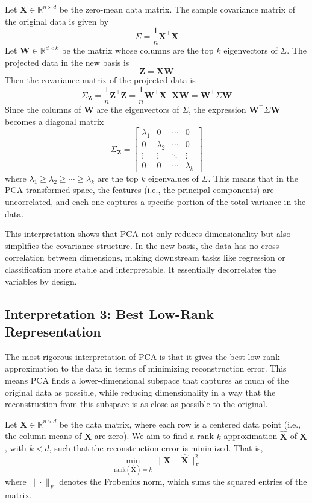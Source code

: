 Let \( \mathbf{X} \in \mathbb{R}^{n \times d} \) be the zero-mean data matrix. The sample covariance matrix of the original data is given by
\[
\Sigma = \frac{1}{n} \mathbf{X}^\top \mathbf{X}
\]
Let \( \mathbf{W} \in \mathbb{R}^{d \times k} \) be the matrix whose columns are the top \( k \) eigenvectors of \( \Sigma \). The projected data in the new basis is
\[
\mathbf{Z} = \mathbf{X} \mathbf{W}
\]
Then the covariance matrix of the projected data is
\[
\Sigma_{\mathbf{Z}} = \frac{1}{n} \mathbf{Z}^\top \mathbf{Z} = \frac{1}{n} \mathbf{W}^\top \mathbf{X}^\top \mathbf{X} \mathbf{W} = \mathbf{W}^\top \Sigma \mathbf{W}
\]
Since the columns of \( \mathbf{W} \) are the eigenvectors of \( \Sigma \), the expression \( \mathbf{W}^\top \Sigma \mathbf{W} \) becomes a diagonal matrix
\[
\Sigma_{\mathbf{Z}} = 
\begin{bmatrix}
\lambda_1 & 0 & \cdots & 0 \\
0 & \lambda_2 & \cdots & 0 \\
\vdots & \vdots & \ddots & \vdots \\
0 & 0 & \cdots & \lambda_k
\end{bmatrix}
\]
where \( \lambda_1 \geq \lambda_2 \geq \cdots \geq \lambda_k \) are the top \( k \) eigenvalues of \( \Sigma \). This means that in the PCA-transformed space, the features (i.e., the principal components) are uncorrelated, and each one captures a specific portion of the total variance in the data.

This interpretation shows that PCA not only reduces dimensionality but also simplifies the covariance structure. In the new basis, the data has no cross-correlation between dimensions, making downstream tasks like regression or classification more stable and interpretable. It essentially decorrelates the variables by design.

\subsection{Interpretation 3: Best Low-Rank Representation}

The most rigorous interpretation of PCA is that it gives the best low-rank approximation to the data in terms of minimizing reconstruction error. This means PCA finds a lower-dimensional subspace that captures as much of the original data as possible, while reducing dimensionality in a way that the reconstruction from this subspace is as close as possible to the original.

Let \(\mathbf{X} \in \mathbb{R}^{n \times d}\) be the data matrix, where each row is a centered data point (i.e., the column means of \(\mathbf{X}\) are zero). We aim to find a rank-\(k\) approximation \(\hat{\mathbf{X}}\) of \(\mathbf{X}\), with \(k < d\), such that the reconstruction error is minimized. That is,
\[
\min_{\text{rank}(\hat{\mathbf{X}}) = k} \|\mathbf{X} - \hat{\mathbf{X}}\|_F^2
\]
where \(\|\cdot\|_F\) denotes the Frobenius norm, which sums the squared entries of the matrix.

